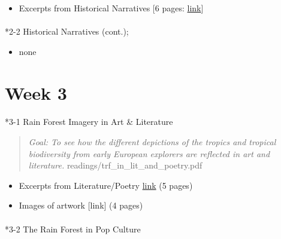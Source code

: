 \documentclass[
  10pt,
  letterpaper,
  oneside,
  open=any]{scrbook}
\makeatletter
\let\oldparagraph\paragraph
\renewcommand{\paragraph}{
    \@ifstar
      \xxxParagraphStar
      \xxxParagraphNoStar
  }
\newcommand{\xxxParagraphStar}[1]{\oldparagraph*{#1}\mbox{}}
\newcommand{\xxxParagraphNoStar}[1]{\oldparagraph{#1}\mbox{}}
\providecommand{\tightlist}{%
  \setlength{\itemsep}{0pt}\setlength{\parskip}{0pt}}
\makeatother
\begin{document}
\begin{itemize}
\tightlist
\item
  Excerpts from Historical Narratives {[}6 pages:
  \href{https://brunalab.github.io/wis2323_syllabus/readings/historical_narratives.pdf}{link}{]}
\end{itemize}

\paragraph*{2-2 Historical Narratives
(cont.);}\label{historical-narratives-cont.}

\begin{itemize}
\tightlist
\item
  none
\end{itemize}

\section*{Week 3}\label{week-3}


\paragraph*{3-1 Rain Forest Imagery in Art \&
Literature}\label{rain-forest-imagery-in-art-literature}

\begin{quote}
\emph{Goal: To see how the different depictions of the tropics and
tropical biodiversity from early European explorers are reflected in art
and literature.} readings/trf\_in\_lit\_and\_poetry.pdf
\end{quote}

\begin{itemize}
\item
  Excerpts from Literature/Poetry
  \href{https://brunalab.github.io/wis2323_syllabus/readings/trf_in_lit_and_poetry.pdf}{link}
  (5 pages)
\item
  Images of artwork {[}link{]} (4 pages)
\end{itemize}

\paragraph*{3-2 The Rain Forest in Pop
Culture}\label{the-rain-forest-in-pop-culture}
\end{document}
